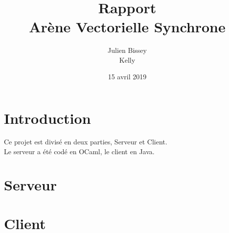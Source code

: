 \documentclass{article}
\begin{document}
\title{Rapport\\
Arène Vectorielle Synchrone{}}
\author{Julien Bissey\\Kelly}
\date{15 avril 2019}

\maketitle

\section{Introduction}

Ce projet est divisé en deux parties, Serveur et Client.\\
Le serveur a été codé en OCaml, le client en Java.

\section{Serveur}


\section{Client}
\end{document}
